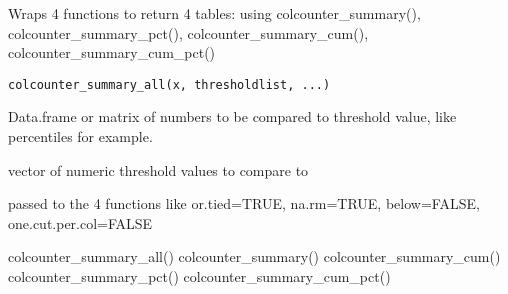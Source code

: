\documentclass[a4paper]{book}
\begin{document}
%
\begin{Description}\relax
Wraps 4 functions to return 4 tables:
using colcounter\_summary(), colcounter\_summary\_pct(),
colcounter\_summary\_cum(), colcounter\_summary\_cum\_pct()
\end{Description}
%
\begin{Usage}
\begin{verbatim}
colcounter_summary_all(x, thresholdlist, ...)
\end{verbatim}
\end{Usage}
%
\begin{Arguments}
\begin{ldescription}
\item[\code{x}] Data.frame or matrix of numbers to be compared to threshold value,
like percentiles for example.

\item[\code{thresholdlist}] vector of numeric threshold values to compare to

\item[\code{...}] passed to the 4 functions
like or.tied=TRUE, na.rm=TRUE, below=FALSE, one.cut.per.col=FALSE
\end{ldescription}
\end{Arguments}
%
\begin{SeeAlso}\relax
colcounter\_summary\_all() colcounter\_summary() colcounter\_summary\_cum() colcounter\_summary\_pct() colcounter\_summary\_cum\_pct()
\end{SeeAlso}
%
\end{document}
